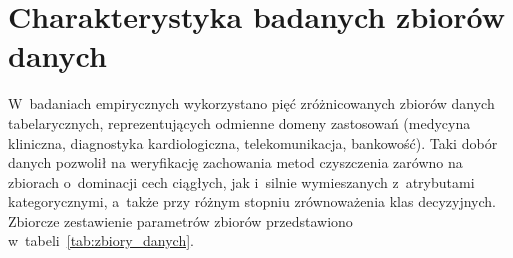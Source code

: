 \section{Charakterystyka badanych zbiorów danych}
W~badaniach empirycznych wykorzystano pięć zróżnicowanych zbiorów danych tabelarycznych, reprezentujących odmienne domeny zastosowań (medycyna kliniczna, diagnostyka kardiologiczna, telekomunikacja, bankowość). Taki dobór danych pozwolił na weryfikację zachowania metod czyszczenia zarówno na zbiorach o~dominacji cech ciągłych, jak i~silnie wymieszanych z~atrybutami kategorycznymi, a~także przy różnym stopniu zrównoważenia klas decyzyjnych. Zbiorcze zestawienie parametrów zbiorów przedstawiono w~tabeli~\ref{tab:zbiory_danych}.

\begin{table}[H]
\centering
\caption{Zbiorcze zestawienie charakterystyki badanych zbiorów danych}
\label{tab:zbiory_danych}
\vspace{0.2cm}
\end{table}

